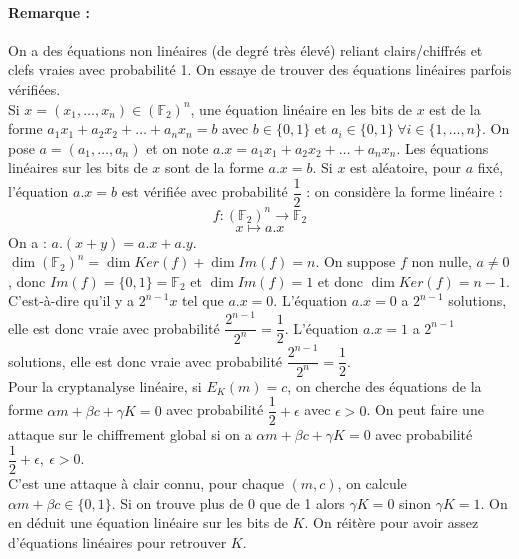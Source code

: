 \documentclass[12pt,a4paper]{report}
\begin{document}
\paragraph{Remarque :\\}
On a des équations non linéaires (de degré très élevé) reliant clairs/chiffrés et clefs vraies avec probabilité 1. On essaye de trouver des équations linéaires parfois vérifiées.\\

Si $x=(x_1,\ldots,x_n) \in (\mathbb{F}_2)^n$, une équation linéaire en les bits de $x$ est de la forme $a_1x_1+a_2x_2+\ldots+a_nx_n =b$ avec $b \in \{0,1\}$ et $a_i\in \{0,1\}\ \forall i \in \{1,\ldots,n\}$. On pose $a=(a_1,\ldots,a_n)$ et on note $a.x = a_1x_1+a_2x_2+\ldots+a_nx_n$. Les équations linéaires sur les bits de $x$ sont de la forme $a.x=b$.
Si $x$ est aléatoire, pour $a$ fixé, l'équation $a.x=b$ est vérifiée avec probabilité $\dfrac{1}{2}$ : on considère la forme linéaire :
$$ f : (\mathbb{F}_2)^n \rightarrow \mathbb{F}_2 $$
$$ x \mapsto a.x $$
On a : $a.(x+y) = a.x+a.y$.\\
$\dim (\mathbb{F}_2)^n = \dim Ker(f)+\dim Im(f) = n$. On suppose $f$ non nulle, $a\neq0$, donc $Im(f)=\{0,1\} = \mathbb{F}_2$ et $\dim Im(f)=1$ et donc $\dim Ker(f)=n-1$. C'est-à-dire qu'il y a $2^{n-1}x$ tel que $a.x=0$. L'équation $a.x=0$ a $2^{n-1}$ solutions, elle est donc vraie avec probabilité $\dfrac{2^{n-1}}{2^n} = \dfrac{1}{2}$. L'équation $a.x=1$ a $2^{n-1}$ solutions, elle est donc vraie avec probabilité $\dfrac{2^{n-1}}{2^n} = \dfrac{1}{2}$.\\

Pour la cryptanalyse linéaire, si $E_K(m)=c$, on cherche des équations de la forme $\alpha m + \beta c + \gamma K = 0$ avec probabilité $\dfrac{1}{2} + \epsilon$ avec $\epsilon > 0$. On peut faire une attaque sur le chiffrement global si on a $\alpha m + \beta c + \gamma K = 0$ avec probabilité $\dfrac{1}{2} + \epsilon,\ \epsilon > 0$. \\

C'est une attaque à clair connu, pour chaque $(m,c)$, on calcule $ \alpha m + \beta c\in \{0,1\}$. Si on trouve plus de 0 que de 1 alors $\gamma K = 0$ sinon $\gamma K = 1$. On en déduit une équation linéaire sur les bits de $K$. On réitère pour avoir assez d'équations linéaires pour retrouver $K$.
\end{document}
